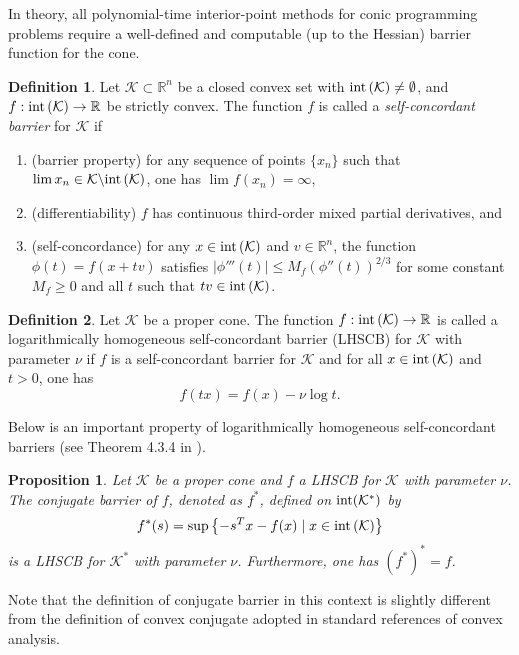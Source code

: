 \documentclass[10pt]{article}
\theoremstyle{definition}
\newtheorem{defin}{Definition}
\theoremstyle{plain}
\newtheorem{prop}{Proposition}
\begin{document}
In theory, all polynomial-time interior-point methods for conic programming problems require a well-defined and computable (up to the Hessian) barrier function for the cone.

\begin{defin}
	Let $\mathcal{K} \subset \mathbb{R}^n$ be a closed convex set with $\textnormal{int}\left(\mathcal{K}\right) \neq \emptyset$, and $f: \textnormal{int} \left(\mathcal{K}\right) \rightarrow \mathbb{R}$ be strictly convex. The function $f$ is called a \textit{self-concordant barrier} for $\mathcal{K}$  if 
	\begin{enumerate}
		\item (barrier property) for any sequence of points $\{x_n\}$ such that $\lim x_n \in \mathcal{K}\backslash \textnormal{int}\left(\mathcal{K}\right)$, one has $\lim f(x_n) = \infty$,
		\item (differentiability) $f$ has continuous third-order mixed partial derivatives, and
		\item (self-concordance) for any $x \in \textnormal{int}\left(\mathcal{K}\right)$ and $v \in \mathbb{R}^n$, the function $\phi(t) = f(x+tv)$ satisfies $|\phi ''' (t)|\leq M_f \left(\phi '' (t)\right)^{2/3}$ for some constant $M_f \geq 0$ and all $t$ such that $tv \in \textnormal{int}\left(\mathcal{K}\right)$.
	\end{enumerate}
\end{defin}

\begin{defin}
	Let $\mathcal{K}$ be a proper cone. The function $f: \textnormal{int}\left(\mathcal{K}\right)\rightarrow \mathbb{R}$ is called a logarithmically homogeneous self-concordant barrier (LHSCB) for $\mathcal{K}$ with parameter $\nu$ if $f$ is a self-concordant barrier for $\mathcal{K}$ and for all $x \in \textnormal{int}\left(\mathcal{K}\right)$ and $t>0$, one has 
	\[f(tx) = f(x) - \nu \log t.\]
\end{defin}

Below is an important property of logarithmically homogeneous self-concordant barriers (see Theorem 4.3.4 in \cite{Akle_thesis}).
\begin{prop} \label{conjugate_of_LHSCB_is_LHSCB_for_dual}
	Let $\mathcal{K}$ be a proper cone and $f$ a LHSCB for $\mathcal{K}$ with parameter $\nu$. The \textnormal{conjugate barrier} of $f$, denoted as $f^*$, defined on $\textnormal{int}(\mathcal{K}^*)$ by 
	\[f^*(s) = \sup \left\{-s^Tx -f(x) \mid x\in \textnormal{int}\left(\mathcal{K}\right)  \right\}\]
	is a LHSCB for $\mathcal{K}^*$ with parameter $\nu$. Furthermore, one has $(f^*)^* = f$.
\end{prop}
Note that the definition of conjugate barrier in this context is slightly different from the definition of convex conjugate adopted in standard references of convex analysis. \\
\end{document}
